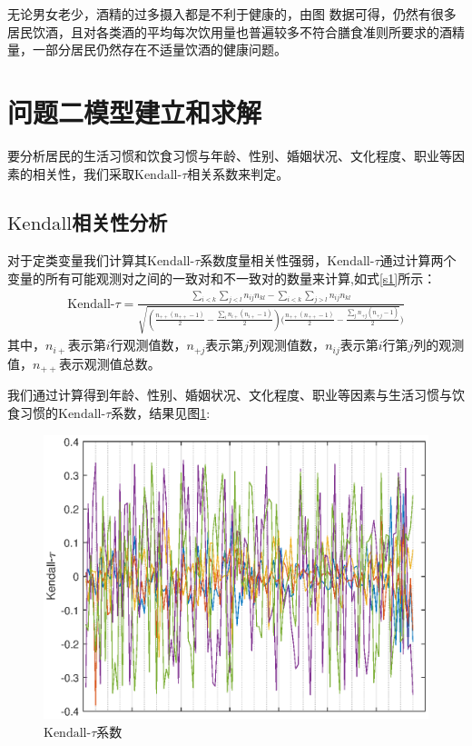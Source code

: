 \documentclass[withoutpreface,bwprint]{cumcmthesis} %
\begin{document}



无论男女老少，酒精的过多摄入都是不利于健康的，由图  数据可得，仍然有很多居民饮酒，且对各类酒的平均每次饮用量也普遍较多不符合膳食准则所要求的酒精量，一部分居民仍然存在不适量饮酒的健康问题。
\clearpage
\section{问题二模型建立和求解}
要分析居民的生活习惯和饮食习惯与年龄、性别、婚姻状况、文化程度、职业等因素的相关性，我们采取$\text{Kendall-}\tau$相关系数来判定。
\subsection{$\text{Kendall}$相关性分析}
对于定类变量我们计算其$\text{Kendall-}\tau$系数度量相关性强弱，$\text{Kendall-}\tau$通过计算两个变量的所有可能观测对之间的一致对和不一致对的数量来计算,如式\ref{s1}所示：
\begin{eqnarray}
\text{Kendall-}\tau=\frac{\sum_{i<k}\sum_{j<l}n_{ij}n_{kl}-\sum_{i<k}\sum_{j>l}n_{ij}n_{kl}}{\sqrt{(\frac{n_{++}(n_{++}-1)}{2}-\frac{\sum_in_{i+}(n_{i+}-1)}{2})(\frac{n_{++}(n_{++}-1)}{2}-\frac{\sum_jn_{+j}(n_{+j}-1)}{2}})}\label{s1}
\end{eqnarray}
其中，$n_{i+}$表示第$i$行观测值数，$n_{+j}$表示第$j$列观测值数，$n_{ij}$表示第$i$行第$j$列的观测值，$n_{++}$表示观测值总数。

我们通过计算得到年龄、性别、婚姻状况、文化程度、职业等因素与生活习惯与饮食习惯的$\text{Kendall-}\tau$系数，结果见图\ref{2}:
\begin{figure}[H]
\centering
\includegraphics{figures/A2.eps}
\caption{$\text{Kendall-}\tau$系数}\label{2}
\end{figure}
\end{document}
